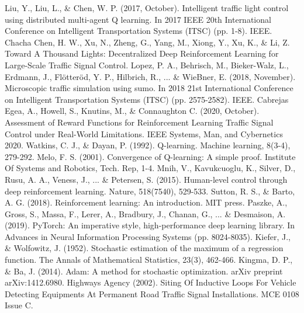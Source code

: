\documentclass[conference]{IEEEtran}
\begin{document}
\begin{thebibliography}{1}
 Liu, Y., Liu, L., \& Chen, W. P. (2017, October). Intelligent traffic light control using distributed multi-agent Q learning. In 2017 IEEE 20th International Conference on Intelligent Transportation Systems (ITSC) (pp. 1-8). IEEE.
 Chacha Chen, H. W., Xu, N., Zheng, G., Yang, M., Xiong, Y., Xu, K., \& Li, Z. Toward A Thousand Lights: Decentralized Deep Reinforcement Learning for Large-Scale Traffic Signal Control.
 Lopez, P. A., Behrisch, M., Bieker-Walz, L., Erdmann, J., Flötteröd, Y. P., Hilbrich, R., ... \& WieBner, E. (2018, November). Microscopic traffic simulation using sumo. In 2018 21st International Conference on Intelligent Transportation Systems (ITSC) (pp. 2575-2582). IEEE.
 Cabrejas Egea, A., Howell, S., Knutins, M., \& Connaughton C. (2020, October). Assessment of Reward Functions for Reinforcement Learning Traffic Signal Control under Real-World Limitations. IEEE Systems, Man, and Cybernetics 2020. 
 Watkins, C. J., \& Dayan, P. (1992). Q-learning. Machine learning, 8(3-4), 279-292.
 Melo, F. S. (2001). Convergence of Q-learning: A simple proof. Institute Of Systems and Robotics, Tech. Rep, 1-4.
 Mnih, V., Kavukcuoglu, K., Silver, D., Rusu, A. A., Veness, J.,  ... \& Petersen, S. (2015). Human-level control through deep reinforcement learning. Nature, 518(7540), 529-533.
 Sutton, R. S., \& Barto, A. G. (2018). Reinforcement learning: An introduction. MIT press.
 Paszke, A., Gross, S., Massa, F., Lerer, A., Bradbury, J., Chanan, G., ... \& Desmaison, A. (2019). PyTorch: An imperative style, high-performance deep learning library. In Advances in Neural Information Processing Systems (pp. 8024-8035).
 Kiefer, J., \& Wolfowitz, J. (1952). Stochastic estimation of the maximum of a regression function. The Annals of Mathematical Statistics, 23(3), 462-466.
 Kingma, D. P., \& Ba, J. (2014). Adam: A method for stochastic optimization. arXiv preprint arXiv:1412.6980.
 Highways Agency (2002). Siting Of Inductive Loops For Vehicle Detecting Equipments At Permanent Road Traffic Signal Installations. MCE 0108 Issue C.
\end{thebibliography}


\end{document}
